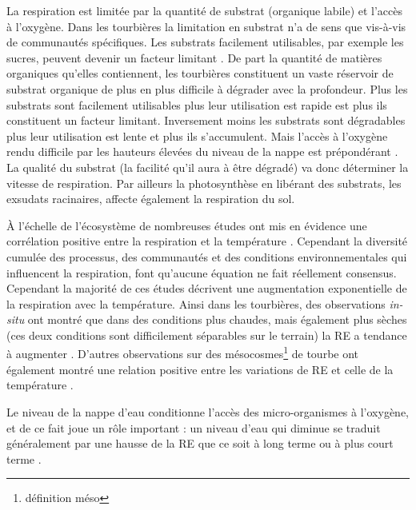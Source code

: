 La respiration est limitée par la quantité de substrat (organique labile) et l'accès à l'oxygène.
Dans les tourbières la limitation en substrat n'a de sens que vis-à-vis de communautés spécifiques.
Les substrats facilement utilisables, par exemple les sucres, peuvent devenir un facteur limitant \plop.
De part la quantité de matières organiques qu'elles contiennent, les tourbières constituent un vaste réservoir de substrat organique de plus en plus difficile à dégrader avec la profondeur.
Plus les substrats sont facilement utilisables plus leur utilisation est rapide est plus ils constituent un facteur limitant.
Inversement moins les substrats sont dégradables plus leur utilisation est lente et plus ils s'accumulent.
Mais l'accès à l'oxygène rendu difficile par les hauteurs élevées du niveau de la nappe est prépondérant \plop.
La qualité du substrat (la facilité qu'il aura à être dégradé) va donc déterminer la vitesse de respiration.
Par ailleurs la photosynthèse en libérant des substrats, les exsudats racinaires, affecte également la respiration du sol.

À l'échelle de l'écosystème de nombreuses études ont mis en évidence une corrélation positive entre la respiration et la température \citep{singh1977,raich1992,luo2006}.
Cependant la diversité cumulée des processus, des communautés et des conditions environnementales qui influencent la respiration, font qu'aucune équation ne fait réellement consensus.
Cependant la majorité de ces études décrivent une augmentation exponentielle de la respiration avec la température.
Ainsi dans les tourbières, des observations \textit{in-situ} ont montré que dans des conditions plus chaudes, mais également plus sèches (ces deux conditions sont difficilement séparables sur le terrain) la RE a tendance à augmenter  \citep{aurela2007,cai2010,ward2013}.
D'autres observations sur des mésocosmes\footnote{définition méso} de tourbe ont également montré une relation positive entre les variations de RE et celle de la température \citep{updegraff2001,weedon2013}.

Le niveau de la nappe d'eau conditionne l'accès des micro-organismes à l'oxygène, et de ce fait joue un rôle important : un niveau d'eau qui diminue se traduit généralement par une hausse de la RE que ce soit à long terme \citep{strack2006,ballantyne2014} ou à plus court terme \citep{aerts1997}.

